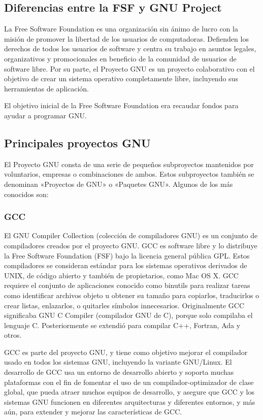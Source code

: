 \subsection{Diferencias entre la FSF y GNU Project}
La Free Software Foundation es una organización sin ánimo de lucro con la misión de promover la libertad de los usuarios de computadoras. Defienden los derechos de todos los usuarios de software y centra su trabajo en asuntos legales, organizativos y promocionales en beneficio de la comunidad de usuarios de software libre. Por su parte, el Proyecto GNU es un proyecto colaborativo con el objetivo de crear un sistema operativo completamente libre, incluyendo sus herramientas de aplicación.

El objetivo inicial de la Free Software Foundation era recaudar fondos para ayudar a programar GNU.

\subsection{Principales proyectos GNU}
El Proyecto GNU consta de una serie de pequeños subproyectos mantenidos por voluntarios, empresas o combinaciones de ambos. Estos subproyectos también se denominan «Proyectos de GNU» o «Paquetes GNU». Algunos de los más conocidos son:

\subsubsection{GCC}
El GNU Compiler Collection (colección de compiladores GNU) es un conjunto de compiladores creados por el proyecto GNU. GCC es software libre y lo distribuye la Free Software Foundation (FSF) bajo la licencia general pública GPL.
Estos compiladores se consideran estándar para los sistemas operativos derivados de UNIX, de código abierto y también de propietarios, como Mac OS X. GCC requiere el conjunto de aplicaciones conocido como binutils para realizar tareas como identificar archivos objeto u obtener su tamaño para copiarlos, traducirlos o crear listas, enlazarlos, o quitarles símbolos innecesarios.
Originalmente GCC significaba GNU C Compiler (compilador GNU de C), porque solo compilaba el lenguaje C. Posteriormente se extendió para compilar C++, Fortran, Ada y otros.

GCC es parte del proyecto GNU, y tiene como objetivo mejorar el compilador usado en todos los sistemas GNU, incluyendo la variante GNU/Linux. El desarrollo de GCC usa un entorno de desarrollo abierto y soporta muchas plataformas con el fin de fomentar el uso de un compilador-optimizador de clase global, que pueda atraer muchos equipos de desarrollo, y asegure que GCC y los sistemas GNU funcionen en diferentes arquitecturas y diferentes entornos, y más aún, para extender y mejorar las características de GCC.

